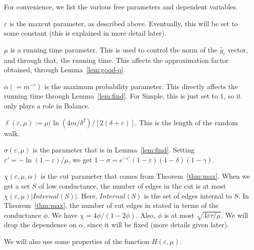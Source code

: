 \documentclass[11pt]{article}
\def\epsilon{\varepsilon}
\newcommand\qti{\widetilde{y_i}}
\newcommand\Balance{{\sc Balance}\xspace}
\newcommand\Simple{{\sc Simple}\xspace}
\begin{document}
For convenience, we list the various free parameters and dependent variables.
\begin{itemize*}
	\item $\epsilon$ is the maxcut parameter, as described above. Eventually, this will be set
	to some constant (this is explained in more detail later).
	\item $\mu$ is a running time parameter. This is used to control the norm
	of the $\qti$ vector, and through that, the running time. This affects the approximation
	factor obtained, through Lemma~\ref{lem:good-q}.
	\item $\alpha (= m^{-\tau})$ is the maximum probability parameter. This directly affects the running
	time through Lemma~\ref{lem:find}. For {\Simple}, this is just set to $1$, so it
	only plays a role in {\Balance}.
	\item $\ell(\epsilon,\mu) := \mu(\ln(4m/\delta^2)/[2(\delta+\epsilon)]$. This is the
	length of the random walk.
	\item $\sigma(\epsilon,\mu)$ is the parameter that is in Lemma~\ref{lem:find}. Setting
	$\epsilon' = -\ln(1-\epsilon)/\mu$, we get $ 1-\sigma = e^{-\epsilon'}(1-\epsilon)(1-\delta)(1-\gamma) $.
	\item $\chi(\epsilon,\mu,\alpha)$ is the cut parameter that comes from Theorem~\ref{thm:max}.
	When we get a set $S$ of low conductance, the number of edges in the cut
	is at most $\chi(\epsilon,\mu)|Internal(S)|$. Here, $Internal(S)$ is the set
	of edges internal to $S$. In Theorem~\ref{thm:max}, the number
	of cut edges in stated in terms of the conductance $\phi$. We have
	$\chi = 4\phi/(1-2\phi)$. Also, $\phi$ is at most $\sqrt{4\epsilon\tau/\mu}$.
	We will drop the dependence on $\alpha$, since it will be fixed (more details
	given later).
\end{itemize*}

We will also use some properties of the function $H(\epsilon,\mu)$.
\end{document}
